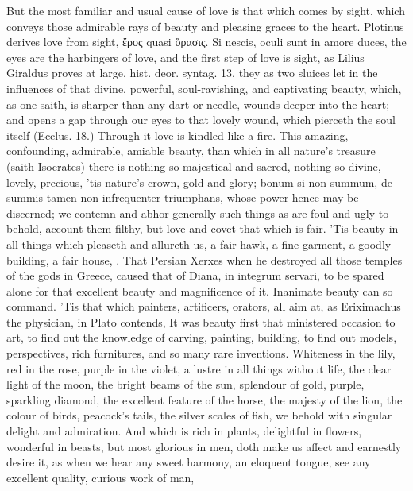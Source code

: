 But the most familiar and usual cause of love is that which comes by
sight, which conveys those admirable rays of beauty and pleasing graces
to the heart. Plotinus derives love from sight, \textgreek{ἔρος} quasi \textgreek{ὅρασις}.
Si nescis, oculi sunt in amore duces, the eyes are the harbingers
of love, and the first step of love is sight, as Lilius Giraldus
proves at large, hist. deor. syntag. 13. they as two sluices let in the
influences of that divine, powerful, soul-ravishing, and captivating
beauty, which, as one saith, is sharper than any dart or needle,
wounds deeper into the heart; and opens a gap through our eyes to that
lovely wound, which pierceth the soul itself (Ecclus. 18.) Through it
love is kindled like a fire. This amazing, confounding, admirable,
amiable beauty, than which in all nature's treasure (saith
Isocrates) there is nothing so majestical and sacred, nothing so
divine, lovely, precious, 'tis nature's crown, gold and glory; bonum si
non summum, de summis tamen non infrequenter triumphans, whose power
hence may be discerned; we contemn and abhor generally such things as
are foul and ugly to behold, account them filthy, but love and covet
that which is fair. 'Tis  beauty in all things which pleaseth and
allureth us, a fair hawk, a fine garment, a goodly building, a fair
house, \etc{}. That Persian Xerxes when he destroyed all those temples of
the gods in Greece, caused that of Diana, in integrum servari, to be
spared alone for that excellent beauty and magnificence of it.
Inanimate beauty can so command. 'Tis that which painters, artificers,
orators, all aim at, as Eriximachus the physician, in Plato contends,
It was beauty first that ministered occasion to art, to find out
the knowledge of carving, painting, building, to find out models,
perspectives, rich furnitures, and so many rare inventions. Whiteness
in the lily, red in the rose, purple in the violet, a lustre in all
things without life, the clear light of the moon, the bright beams of
the sun, splendour of gold, purple, sparkling diamond, the excellent
feature of the horse, the majesty of the lion, the colour of birds,
peacock's tails, the silver scales of fish, we behold with singular
delight and admiration. And which is rich in plants, delightful
in flowers, wonderful in beasts, but most glorious in men, doth make us
affect and earnestly desire it, as when we hear any sweet harmony, an
eloquent tongue, see any excellent quality, curious work of man,
